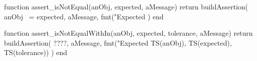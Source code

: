 \stopTestSuite

\startTestSuite[title=assert_isNotEqual]

\startLuaCode
function assert_isNotEqual(anObj, expected, aMessage)
  return buildAssertion(
    anObj ~= expected,
    aMessage,
    fmt("Expected %
  )
end
\stopLuaCode

\stopTestSuite

\startTestSuite[title=assert_isNotEqualWithIn]
\startLuaCode
function assert_isNotEqualWithIn(anObj, expected, tolerance, aMessage)
  return buildAssertion(
    ????,
    aMessage,
    fmt("Expected %
      TS(anObj), TS(expected), TS(tolerance))
  )
end
\stopLuaCode

\stopTestSuite

\startTestSuite[title=assert_isNumber]

\stopTestSuite

\startTestSuite[title=assert_isGT]

\stopTestSuite

\startTestSuite[title=assert_isGTE]

\stopTestSuite

\startTestSuite[title=assert_isLT]

\stopTestSuite

\startTestSuite[title=assert_isLTE]

\stopTestSuite

\startTestSuite[title=assert_isNotNumber]

\stopTestSuite

\startTestSuite[title=assert_isString]

\stopTestSuite

\startTestSuite[title=assert_matches]

\stopTestSuite

\startTestSuite[title=assert_doesNotMatch]

\stopTestSuite

\startTestSuite[title=assert_length]

\stopTestSuite

\startTestSuite[title=assert_isNotLength]

\stopTestSuite

\startTestSuite[title=assert_isNotString]

\stopTestSuite

\startTestSuite[title=assert_isTable]

\stopTestSuite

